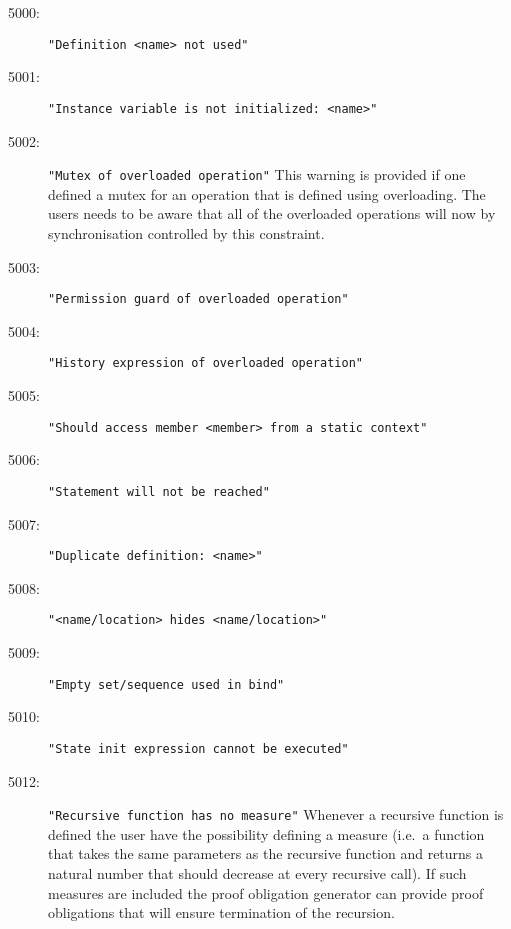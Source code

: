 %
%
%

\begin{description}
\item[5000:] \texttt{"Definition <name> not used"}
\item[5001:] \texttt{"Instance variable is not initialized:\ <name>"}
\item[5002:] \texttt{"Mutex of overloaded operation"} This warning is
  provided if one defined a mutex for an operation that is defined
  using overloading. The users needs to be aware that all of the
  overloaded operations will now by synchronisation controlled by this
  constraint. 
\item[5003:] \texttt{"Permission guard of overloaded operation"}
\item[5004:] \texttt{"History expression of overloaded operation"}
\item[5005:] \texttt{"Should access member <member> from a static context"}
\item[5006:] \texttt{"Statement will not be reached"}
\item[5007:] \texttt{"Duplicate definition:\ <name>"}
\item[5008:] \texttt{"<name/location> hides <name/location>"}
\item[5009:] \texttt{"Empty set/sequence used in bind"}
\item[5010:] \texttt{"State init expression cannot be executed"}
\item[5012:] \texttt{"Recursive function has no measure"} Whenever a
  recursive function is defined the user have the possibility defining
  a measure (i.e.\ a function that takes the same parameters as the
  recursive function and returns a natural number that should decrease
  at every recursive call). If such measures are included the proof
  obligation generator can provide proof obligations that will ensure
  termination of the recursion.

\end{description}
